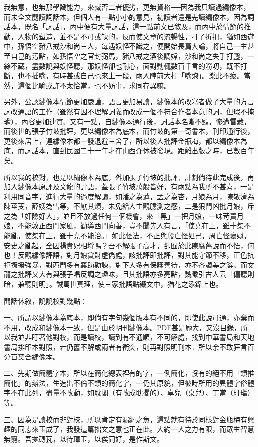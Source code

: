 我無意，也無那學識能力，來臧否二者優劣，更無資格──因為我只讀過繡像本，而未全文閱讀詞話本，但個人有一點小小的意見，初讀者還是先讀繡像本，因為詞話本，既名「詞話」，內中便有大量詞話，這一點前文已敘及，而內中於情節的推動，人物的塑造，並不是不可或缺的，反而使文章的流暢性，打了折扣，猶如西遊中，孫悟空豬八戒沙和尚三人，每遇妖怪不識之，便開始長篇大論，將自己一生甚至自己的污點，如孫悟空之官封弼馬，豬八戒之酒後調嫦，沙和尚之失手打盞，一絲不藏，盡數說與妖怪聽，那妖怪卻也耐心，面對動輒數百千言的嘮叨，既不打斷，也不插嘴，有時甚或自己也來上一段，兩人陣前大打「嘴炮」。樂此不疲。當然，這個比喻或許不太恰當，也不妨事，求同存異嘛。

另外，公認繡像本情節更加嚴謹，語言更加易讀，繡像本的改寫者做了大量的方言詞改通語的工作（雖然有因不理解詞義而改成一個不符合作者本意的詞，但瑕不掩瑜），內容更加連貫。又有一點，自繡像本通行後，詞話本名漸不顯，慘遭雪藏，而後世的張子竹坡批評，更以繡像本為底本，而竹坡的第一奇書本，刊印通行後，更後來居上，連繡像本都一發退避三舍了，所以後人批評金瓶梅，都以繡像本為底，而詞話本，直到民國二十一年才在山西介休被發現。距離出版之時，已數百年矣。

所以我的校對，也是以繡像本為底，外加張子竹坡的批評，計劃倘待此完成後，再加入繡像本原評及文龍的評語，蓋張子竹坡萬般皆好，有兩點為我所不甚喜，一是利用同音字，進行大量的過度解讀，如潘之為蓮，孟之為杏，月娘為月，陳敬濟為陳莖芰，薛嫂為雪等，不厭其煩，未免給人主觀臆測之感，二是狠鬥凶批月娘，斥之為「奸險好人」，並且不放過任何一個機會，來「黑」一把月娘，一味苛責月娘，不能敦正西門家風，勸導西門向善，豈不聞先人有言，「使堯在上，雖十桀不能亂，使桀在上，雖十堯不能治。」如此怪法，不正與殷亡怪妲己，周亡怪褒姒，安史之亂起，全因楊貴妃相埒嗎？吾不解張子高才，卻囿於此陳腐舊說而不悟，何也！反觀繡像評語，對月娘貪財虛偽處，該批評即批評，對其能守節不移，正色抗拒撩撥強暴，對西門多有襄助勸諫，對下人多有保護善待，亦不吝讚美之辭，而文龍之批評又大有與張子唱反調之趣味，且其批語亦多亮點，魏徵引古人云「偏聽則暗，兼聽則明」。誠萬世真理，使三家批語點綴文中，猶花之添錦上也。

閒話休敘，說說校對幾點：

一、所謂以繡像本為底本，即倘有字句幾個版本有不同的，即使此說可通，亦棄而不用，改成和繡像本一致，但是由於明刊繡像本。PDF甚是龐大，又沒目錄，所以我並非盯著他對校，而是讀校，讀到有不通順，不可解處，找到中華書局和天地書局排印本對照，若仍舊不解或兩者有衝突，則再對照明刊本，所以余不敢狂言百分百契合繡像本。

二、先期做簡體字本，所以在簡化總表裡有的字，一例簡化，沒有的絕不用「類推簡化」的辦法，生造出不倫不類的簡化字，一仍其原貌，但彼時所用的異體字俗體字不在此列，盡量不改動，如耽閣（有改成耽擱的）、卓兒（桌兒）、丁當（玎璫）等。

三、因為是讀校而非對校，所以肯定有漏網之魚，這點就有待於同樣對金瓶梅有興趣的同志來玉成了，我發這篇拙文之意也正在此。大約一人之力有限，而眾生智慧無窮。吾拋磚瓦，以待璋玉，以俟同好，是作斯文。

\begin{quotation}
\end{quotation}
